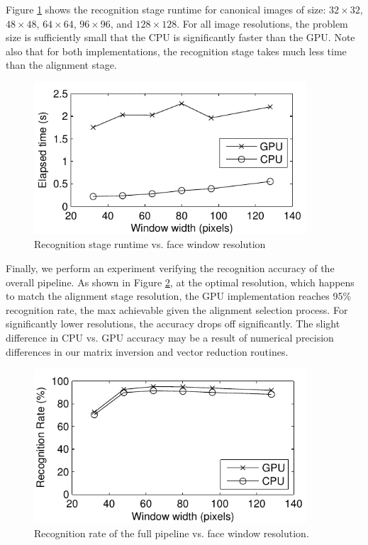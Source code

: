 Figure \ref{fig:recognition_stage_runtime} shows the recognition stage runtime
for canonical images of size: $32\times32$, $48 \times 48$, $64 \times 64$, $96 \times
96$, and $128 \times 128$.  For all image resolutions, the problem size
is sufficiently small that the CPU is significantly faster than the GPU.  Note
also that for both implementations, the recognition stage takes much less time
than the alignment stage.
\begin{figure}[t!]
\centering
\includegraphics[width=4in]{figures_ijcb/speedVsResolution.pdf} 
\caption{Recognition stage runtime vs. face window resolution}
\label{fig:recognition_stage_runtime} \end{figure}

Finally, we perform an experiment verifying the recognition accuracy of the
overall pipeline.  As shown in Figure \ref{fig:accuracy_vs_resolution},
at the optimal resolution, which happens to match the alignment stage
resolution, the GPU implementation reaches 95\% recognition rate, the max
achievable given the alignment selection process.  For significantly lower resolutions,
the accuracy drops off significantly.  The slight difference in CPU vs. GPU
accuracy may be a result of numerical precision differences in our matrix
inversion and vector reduction routines.
\begin{figure}[t!]
\centering
\includegraphics[width=4in]{figures_ijcb/accuracyVsResolution.pdf} 
\caption{Recognition rate of the full pipeline vs. face window resolution.} 
\label{fig:accuracy_vs_resolution}
\end{figure}

